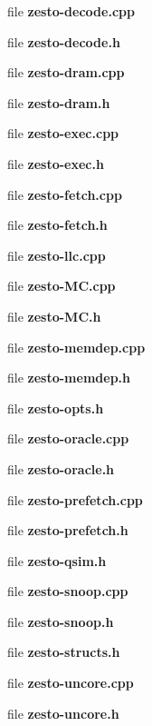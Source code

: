 \begin{CompactItemize}
file {\bf zesto-decode.cpp}
\item 
file {\bf zesto-decode.h}
\item 
file {\bf zesto-dram.cpp}
\item 
file {\bf zesto-dram.h}
\item 
file {\bf zesto-exec.cpp}
\item 
file {\bf zesto-exec.h}
\item 
file {\bf zesto-fetch.cpp}
\item 
file {\bf zesto-fetch.h}
\item 
file {\bf zesto-llc.cpp}
\item 
file {\bf zesto-MC.cpp}
\item 
file {\bf zesto-MC.h}
\item 
file {\bf zesto-memdep.cpp}
\item 
file {\bf zesto-memdep.h}
\item 
file {\bf zesto-opts.h}
\item 
file {\bf zesto-oracle.cpp}
\item 
file {\bf zesto-oracle.h}
\item 
file {\bf zesto-prefetch.cpp}
\item 
file {\bf zesto-prefetch.h}
\item 
file {\bf zesto-qsim.h}
\item 
file {\bf zesto-snoop.cpp}
\item 
file {\bf zesto-snoop.h}
\item 
file {\bf zesto-structs.h}
\item 
file {\bf zesto-uncore.cpp}
\item 
file {\bf zesto-uncore.h}
\end{CompactItemize}
